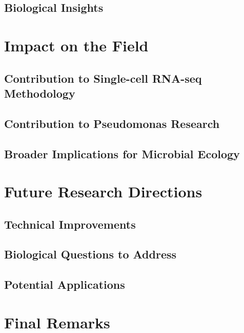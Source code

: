\documentclass[
  11pt,
  a4paper,
]{report}
\begin{document}
\subsection{Biological Insights}\label{biological-insights}

\section{Impact on the Field}\label{impact-on-the-field}

\subsection{Contribution to Single-cell RNA-seq
Methodology}\label{contribution-to-single-cell-rna-seq-methodology}

\subsection{Contribution to Pseudomonas
Research}\label{contribution-to-pseudomonas-research}

\subsection{Broader Implications for Microbial
Ecology}\label{broader-implications-for-microbial-ecology}

\section{Future Research Directions}\label{future-research-directions-1}

\subsection{Technical Improvements}\label{technical-improvements-1}

\subsection{Biological Questions to
Address}\label{biological-questions-to-address}

\subsection{Potential Applications}\label{potential-applications-1}

\section{Final Remarks}\label{final-remarks}
\end{document}
